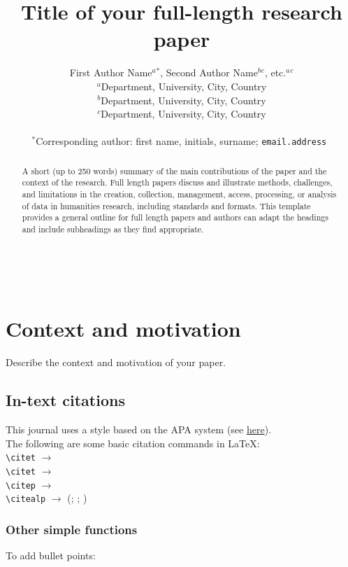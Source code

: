 \documentclass{article}
\title{Title of your full-length research paper}
\author{First Author Name$^{a}$$^{*}$, Second Author Name$^{b}$$^{c}$, etc.$^{a}$$^{c}$ \\
        \small $^{a}$Department, University, City, Country \\
        \small $^{b}$Department, University, City, Country \\
        \small $^{c}$Department, University, City, Country \\\\
        \small $^{*}$Corresponding author: first name, initials, surname; \tt{email.address}
}
\date{} %
\begin{document}
\maketitle

\begin{abstract} 
\noindent A short (up to 250 words) summary of the main contributions of the paper and the context of the research. Full length papers discuss and illustrate methods, challenges, and limitations in the creation, collection, management, access, processing, or analysis of data in humanities research, including standards and formats. This template provides a general outline for full length papers and authors can adapt the headings and include subheadings as they find appropriate.  \end{abstract}

\noindent{}\\

\noindent{} 

\section{Context and motivation}
Describe the context and motivation of your paper.

\subsection{In-text citations}
This journal uses a style based on the APA system (see \href{https://openhumanitiesdata.metajnl.com/about/submissions/#References}{here}). \\
The following are some basic citation commands in \LaTeX: \\

\noindent
\verb|\citet| $\rightarrow$ \citet{jenset&mcgil}\\
\verb|\citet| $\rightarrow$ \citet{shree-a}\\
\verb|\citep| $\rightarrow$ \citep{fabricius-hansen2012b}\\
\verb|\citealp| $\rightarrow$ (\citealp{eckhoff2018a}; \citealp{fabricius-hansen2012b}; \citealp{shree-a})\\

\subsubsection{Other simple functions}
To add bullet points:
\end{document}
